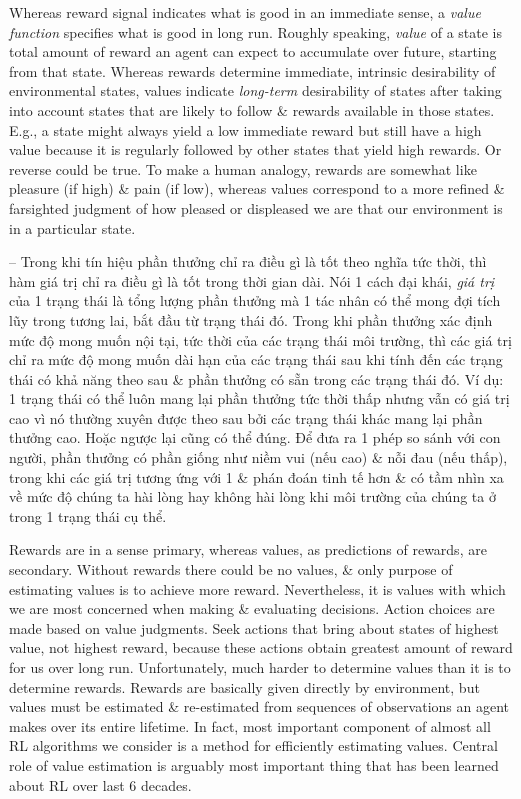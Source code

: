 \documentclass{article}
\begin{document}
\begin{itemize}
\begin{itemize}
        Whereas reward signal indicates what is good in an immediate sense, a {\it value function} specifies what is good in long run. Roughly speaking, {\it value} of a state is total amount of reward an agent can expect to accumulate over future, starting from that state. Whereas rewards determine immediate, intrinsic desirability of environmental states, values indicate {\it long-term} desirability of states after taking into account states that are likely to follow \& rewards available in those states. E.g., a state might always yield a low immediate reward but still have a high value because it is regularly followed by other states that yield high rewards. Or reverse could be true. To make a human analogy, rewards are somewhat like pleasure (if high) \& pain (if low), whereas values correspond to a more refined \& farsighted judgment of how pleased or displeased we are that our environment is in a particular state.

        -- Trong khi tín hiệu phần thưởng chỉ ra điều gì là tốt theo nghĩa tức thời, thì hàm giá trị {\it} chỉ ra điều gì là tốt trong thời gian dài. Nói 1 cách đại khái, {\it giá trị} của 1 trạng thái là tổng lượng phần thưởng mà 1 tác nhân có thể mong đợi tích lũy trong tương lai, bắt đầu từ trạng thái đó. Trong khi phần thưởng xác định mức độ mong muốn nội tại, tức thời của các trạng thái môi trường, thì các giá trị chỉ ra mức độ mong muốn dài hạn của các trạng thái sau khi tính đến các trạng thái có khả năng theo sau \& phần thưởng có sẵn trong các trạng thái đó. Ví dụ: 1 trạng thái có thể luôn mang lại phần thưởng tức thời thấp nhưng vẫn có giá trị cao vì nó thường xuyên được theo sau bởi các trạng thái khác mang lại phần thưởng cao. Hoặc ngược lại cũng có thể đúng. Để đưa ra 1 phép so sánh với con người, phần thưởng có phần giống như niềm vui (nếu cao) \& nỗi đau (nếu thấp), trong khi các giá trị tương ứng với 1 \& phán đoán tinh tế hơn \& có tầm nhìn xa về mức độ chúng ta hài lòng hay không hài lòng khi môi trường của chúng ta ở trong 1 trạng thái cụ thể.

        Rewards are in a sense primary, whereas values, as predictions of rewards, are secondary. Without rewards there could be no values, \& only purpose of estimating values is to achieve more reward. Nevertheless, it is values with which we are most concerned when making \& evaluating decisions. Action choices are made based on value judgments. Seek actions that bring about states of highest value, not highest reward, because these actions obtain greatest amount of reward for us over long run. Unfortunately, much harder to determine values than it is to determine rewards. Rewards are basically given directly by environment, but values must be estimated \& re-estimated from sequences of observations an agent makes over its entire lifetime. In fact, most important component of almost all RL algorithms we consider is a method for efficiently estimating values. Central role of value estimation is arguably most important thing that has been learned about RL over last 6 decades.


\end{itemize}
\end{itemize}
\end{document}
